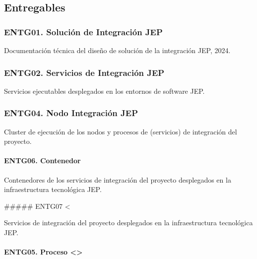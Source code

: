 \documentclass[
  paper=a4,
  ,captions=tableheading
]{scrartcl}
\renewenvironment{quote}{\begin{customblockquote}\list{}{\rightmargin=0em\leftmargin=0em}%
\item\relax\color{blockquote-text}\ignorespaces}{\unskip\unskip\endlist\end{customblockquote}}
\begin{document}
\subsection{Entregables}\label{sec:entregables}

\subsubsection{ENTG01. Solución de Integración
JEP}\label{sec:entg01.-soluciuxf3n-de-integraciuxf3n-jep}

Documentación técnica del diseño de solución de la integración JEP,
2024.

\subsubsection{ENTG02. Servicios de Integración
JEP}\label{sec:entg02.-servicios-de-integraciuxf3n-jep}

Servicios ejecutables desplegados en los entornos de software JEP.

\subsubsection{ENTG04. Nodo Integración
JEP}\label{sec:entg04.-nodo-integraciuxf3n-jep}

Cluster de ejecución de los nodos y procesos de (servicios) de
integración del proyecto.

\paragraph{ENTG06. Contenedor}\label{sec:entg06.-contenedor}

Contenedores de los servicios de integración del proyecto desplegados en
la infraestructura tecnológica JEP.

\#\#\#\#\# ENTG07 \textless{}

\begin{quote}
\end{quote}

Servicios de integración del proyecto desplegados en la infraestructura
tecnológica JEP.

\paragraph{\texorpdfstring{ENTG05. Proceso
\textless{}\textgreater{}}{ENTG05. Proceso \textless\textgreater{}}}\label{sec:entg05.-proceso}
\end{document}
